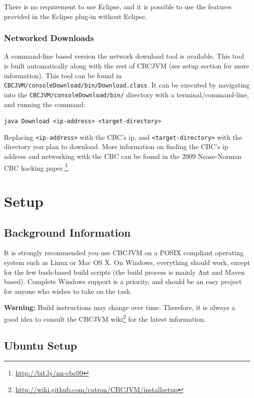 \documentclass[12pt,letterpaper]{article}
\newcommand{\urlfootnote}[1]{\footnote{\url{#1}}}
\newcommand{\code}[1]{\par\texttt{#1}\par}
\begin{document}
There is no requirement to use Eclipse, and it is possible to use the features provided in the Eclipse plug-in without Eclipse.



\subsubsection{Networked Downloads}

A command-line based version the network download tool is available. This tool is built automatically along with the rest of CBCJVM (see setup section for more information). This tool can be found in \texttt{CBCJVM/\-consoleDownload/\-bin/\-Download.\-class}. It can be executed by navigating into the \texttt{CBCJVM/\-consoleDownload/\-bin/} directory with a terminal/command-line, and running the command: \code{java Download <ip-address> <target-directory>} Replacing \texttt{<ip-address>} with the CBC's ip, and \texttt{<target-directory>} with the directory you plan to download. More information on finding the CBC's ip address and networking with the CBC can be found in the 2009 Nease-Norman CBC hacking paper.\urlfootnote{http://bit.ly/nn-cbc09}.



\pagebreak
\section{Setup}

\subsection{Background Information}

It is strongly recommended you use CBCJVM on a POSIX compliant operating system such as Linux or Mac OS X. On Windows, everything should work, except for the few bash-based build scripts (the build process is mainly Ant and Maven based). Complete Windows support is a priority, and should be an easy project for anyone who wishes to take on the task.

\textbf{Warning:} Build instructions may change over time. Therefore, it is always a good idea to consult the CBCJVM wiki\urlfootnote{http://wiki.github.com/catron/CBCJVM/installsetup} for the latest information.

\subsection{Ubuntu Setup}
\end{document}
